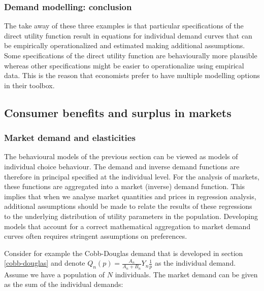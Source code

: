 \documentclass[
]{book}
\begin{document}
\hypertarget{demand-modelling-conclusion}{%
\subsubsection{Demand modelling: conclusion}\label{demand-modelling-conclusion}}

The take away of these three examples is that particular specifications of the direct utility function result in equations for individual demand curves that can be empirically operationalized and estimated making additional assumptions. Some specifications of the direct utility function are behaviourally more plausible whereas other specifications might be easier to operationalize using empirical data. This is the reason that economists prefer to have multiple modelling options in their toolbox.

\hypertarget{consumer-benefits-and-surplus-in-markets}{%
\subsection{Consumer benefits and surplus in markets}\label{consumer-benefits-and-surplus-in-markets}}

\hypertarget{market-demand-and-elasticities}{%
\subsubsection{Market demand and elasticities}\label{market-demand-and-elasticities}}

The behavioural models of the previous section can be viewed as models of individual choice behaviour. The demand and inverse demand functions are therefore in principal specified at the individual level. For the analysis of markets, these functions are aggregated into a market (inverse) demand function. This implies that when we analyse market quantities and prices in regression analysis, additional assumptions should be made to relate the results of these regressions to the underlying distribution of utility parameters in the population. Developing models that account for a correct mathematical aggregation to market demand curves often requires stringent assumptions on preferences.

Consider for example the Cobb-Douglas demand that is developed in section \ref{cobb-douglas} and denote \(Q_n (p)=\frac{A_n}{A_n+B_n} Y_n \frac{1}{p}\) as the individual demand. Assume we have a population of \(N\) individuals. The market demand can be given as the sum of the individual demands:
\end{document}
